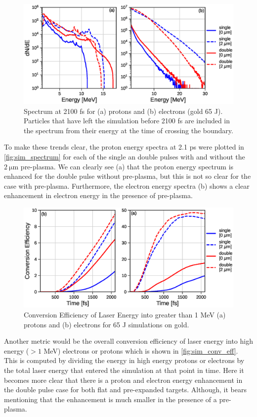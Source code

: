 \begin{figure}
	\centering
	\includegraphics[width=0.9\linewidth]{planning/images/titan/spectrum_2100fs.eps}
	\caption{Spectrum at 2100 fs for (a) protons and (b) electrons (gold 65 J). Particles that have left the simulation before 2100 fs are included in the spectrum from their energy at the time of crossing the boundary.}
	\label{fig:sim_spectrum}
\end{figure}

To make these trends clear, the proton energy spectra at 2.1 ps were plotted in \autoref{fig:sim_spectrum} for each of the single an double pulses with and without the $\SI{2}{\micro \meter}$ pre-plasma. We can clearly see (a) that the proton energy spectrum is enhanced for the double pulse without pre-plasma, but this is not so clear for the case with pre-plasma. Furthermore, the electron energy spectra (b) shows a clear enhancement in electron energy in the presence of pre-plasma. 

\begin{figure}
	\centering
	\includegraphics[width=0.9\linewidth]{planning/images/titan/conversion_efficiency.eps}
	\caption{Conversion Efficiency of Laser Energy into greater than 1 MeV (a) protons and (b) electrons for 65 J simulations on gold.}
	\label{fig:sim_conv_eff}
\end{figure}

Another metric would be the overall conversion efficiency of laser energy into high energy ($> 1 $ MeV) electrons or protons which is shown in \autoref{fig:sim_conv_eff}. This is computed by dividing the energy in high energy protons or electrons by the total laser energy that entered the simulation at that point in time. Here it becomes more clear that there is a proton and electron energy enhancement in the double pulse case for both flat and pre-expanded targets. Although, it bears mentioning that the enhancement is much smaller in the presence of a pre-plasma. 

